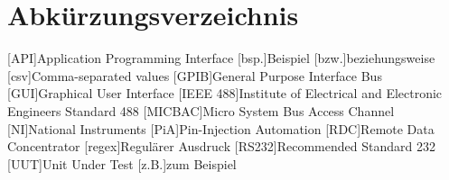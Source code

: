 \section*{Abkürzungsverzeichnis}
\begin{acronym}[MICBAC]
[API]{Application Programming Interface}
[bsp.]{Beispiel}
[bzw.]{beziehungsweise}
[csv]{Comma-separated values}
[GPIB]{General Purpose Interface Bus}
[GUI]{Graphical User Interface}
[IEEE 488]{Institute of Electrical and Electronic Engineers Standard 488}
[MICBAC]{Micro System Bus Access Channel}
[NI]{National Instruments}
[PiA]{Pin-Injection Automation}
[RDC]{Remote Data Concentrator}
[regex]{Regulärer Ausdruck}
[RS232]{Recommended Standard 232}
[UUT]{Unit Under Test}
[z.B.]{zum Beispiel}
\end{acronym}